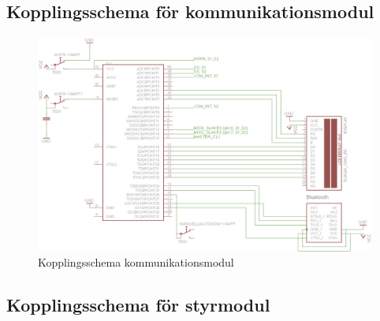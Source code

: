 \documentclass[a4paper,12pt,fleqn]{article}
\begin{document}
\subsection{Kopplingsschema för kommunikationsmodul}

\begin{figure}[ht] %
  \begin{center}
  \includegraphics[keepaspectratio=true,width=\linewidth]{komschema.jpg}  %
  \end{center}
  \caption{Kopplingsschema kommunikationsmodul} %
  \label{fig:kopplingkom} %
\end{figure}
 \clearpage %
 

\subsection{Kopplingsschema för styrmodul}
\end{document}
